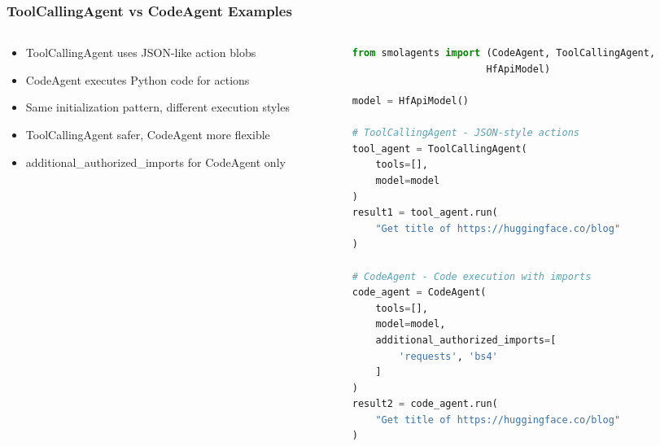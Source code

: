 \begin{frame}[fragile]\frametitle{ToolCallingAgent vs CodeAgent Examples}
\begin{columns}
\begin{column}{0.5\textwidth}
      \begin{itemize}
	\item ToolCallingAgent uses JSON-like action blobs
	\item CodeAgent executes Python code for actions
	\item Same initialization pattern, different execution styles
	\item ToolCallingAgent safer, CodeAgent more flexible
	\item additional\_authorized\_imports for CodeAgent only
	  \end{itemize}
\end{column}
\begin{column}{0.5\textwidth}
\begin{lstlisting}[language=Python, basicstyle=\tiny]
from smolagents import (CodeAgent, ToolCallingAgent, 
                       HfApiModel)

model = HfApiModel()

# ToolCallingAgent - JSON-style actions
tool_agent = ToolCallingAgent(
    tools=[], 
    model=model
)
result1 = tool_agent.run(
    "Get title of https://huggingface.co/blog"
)

# CodeAgent - Code execution with imports
code_agent = CodeAgent(
    tools=[], 
    model=model, 
    additional_authorized_imports=[
        'requests', 'bs4'
    ]
)
result2 = code_agent.run(
    "Get title of https://huggingface.co/blog"
)
\end{lstlisting}
\end{column}
\end{columns}
\end{frame}

